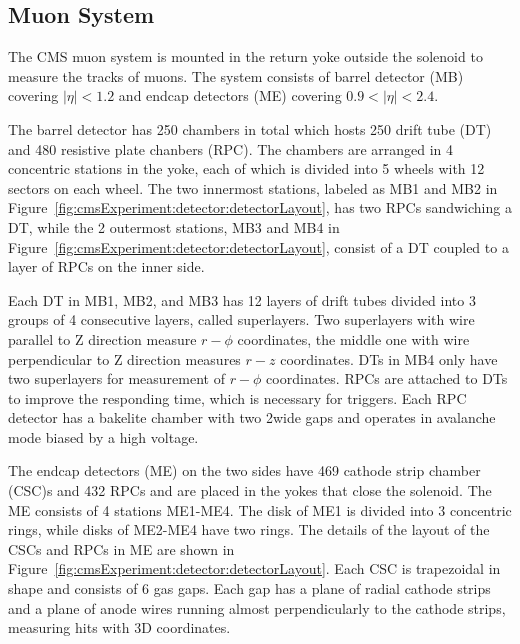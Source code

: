 \subsection{Muon System}
The CMS muon system \cite{cms:muonChamberTdr:CMS:1997iti} is mounted in the return yoke outside the solenoid to measure the tracks of muons. The system consists of barrel detector (MB) covering $|\eta|<1.2$ and endcap detectors (ME) covering $0.9 < |\eta| < 2.4$. 

The barrel detector has 250 chambers in total which hosts 250 drift tube (DT) and 480 resistive plate chanbers (RPC). The chambers are arranged in 4 concentric stations in the yoke, each of which is divided into 5 wheels with 12 sectors on each wheel. The two innermost stations, labeled as MB1 and MB2 in Figure~\ref{fig:cmsExperiment:detector:detectorLayout}, has two RPCs sandwiching a DT, while the 2 outermost stations, MB3 and MB4 in Figure~\ref{fig:cmsExperiment:detector:detectorLayout}, consist of a DT coupled to a layer of RPCs on the inner side. 

Each DT in MB1, MB2, and MB3 has 12 layers of drift tubes divided into 3 groups of 4 consecutive layers, called superlayers. Two superlayers with wire parallel to Z direction measure $r-\phi$ coordinates, the middle one with wire perpendicular to Z direction measures $r-z$ coordinates. DTs in MB4 only have two superlayers for measurement of $r-\phi$ coordinates. RPCs are attached to DTs to improve the responding time, which is necessary for triggers. Each RPC detector has a bakelite chamber with two 2\mm wide gaps and operates in avalanche mode biased by a high voltage. 

The endcap detectors (ME) on the two sides have 469 cathode strip chamber (CSC)s and 432 RPCs and are placed in the yokes that close the solenoid. The ME consists of 4 stations ME1-ME4. The disk of ME1 is divided into 3 concentric rings, while disks of ME2-ME4 have two rings. The details of the layout of the CSCs and RPCs in ME are shown in Figure~\ref{fig:cmsExperiment:detector:detectorLayout}. Each CSC is trapezoidal in shape and consists of 6 gas gaps. Each gap has a plane of radial cathode strips and a plane of anode wires running almost perpendicularly to the cathode strips, measuring hits with 3D coordinates.

